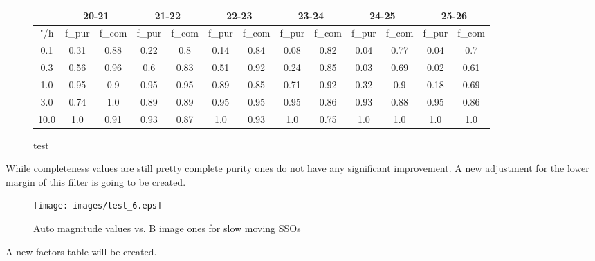 \documentclass{article}
\begin{document}
\begin{figure}[H]
\centering
\begin{tabular}{|c|c|c|c|c|c|c|c|c|c|c|c|c|}
\hline
\multicolumn{1}{|c|}{} & \multicolumn{2}{|c|}{20-21} & \multicolumn{2}{|c|}{21-22} & \multicolumn{2}{|c|}{22-23} & \multicolumn{2}{|c|}{23-24} & \multicolumn{2}{|c|}{24-25} & \multicolumn{2}{|c|}{25-26}\\
\hline \hline
"/h & f\_pur & f\_com & f\_pur & f\_com & f\_pur & f\_com & f\_pur & f\_com & f\_pur & f\_com & f\_pur & f\_com \\
\hline
0.1 & 0.31 & 0.88 & 0.22 & 0.8 & 0.14 & 0.84 & 0.08 & 0.82 & 0.04 & 0.77 & 0.04 & 0.7\\
\hline
0.3 & 0.56 & 0.96 & 0.6 & 0.83 & 0.51 & 0.92 & 0.24 & 0.85 & 0.03 & 0.69 & 0.02 & 0.61\\
\hline
1.0 & 0.95 & 0.9 & 0.95 & 0.95 & 0.89 & 0.85 & 0.71 & 0.92 & 0.32 & 0.9 & 0.18 & 0.69\\
\hline
3.0 & 0.74 & 1.0 & 0.89 & 0.89 & 0.95 & 0.95 & 0.95 & 0.86 & 0.93 & 0.88 & 0.95 & 0.86\\
\hline
10.0 & 1.0 & 0.91 & 0.93 & 0.87 & 1.0 & 0.93 & 1.0 & 0.75 & 1.0 & 1.0 & 1.0 & 1.0\\
\hline
\end{tabular}
\caption{test}
\end{figure}

While completeness values are still pretty complete purity ones do not have any significant improvement. A new adjustment for the lower margin of this filter is going to be created. 

\begin{figure}[H]
\centering
\texttt{[image: images/test\_6.eps]}
\caption{Auto magnitude values vs. B image ones for slow moving SSOs}
\end{figure}

A new factors table will be created.
\end{document}
